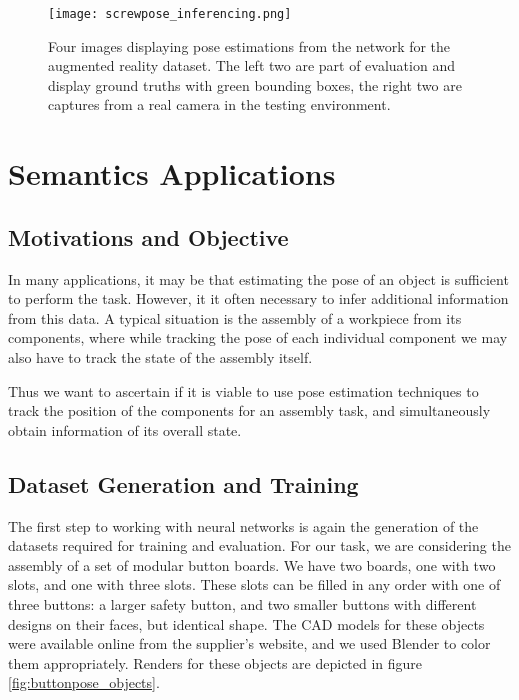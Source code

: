 \begin{figure}[ht]
    \texttt{[image: screwpose\_inferencing.png]}
    \caption{Four images displaying pose estimations from the network for the augmented reality dataset. The left two are part of evaluation and display ground truths with green bounding boxes, the right two are captures from a real camera in the testing environment.}
    \label{fig:screwpose_inferencing}
\end{figure}

\section{Semantics Applications}

\subsection{Motivations and Objective}

In many applications, it may be that estimating the pose of an object is sufficient to perform the task. However, it it often necessary to infer additional information from this data. A typical situation is the assembly of a workpiece from its components, where while tracking the pose of each individual component we may also have to track the state of the assembly itself.

Thus we want to ascertain if it is viable to use pose estimation techniques to track the position of the components for an assembly task, and simultaneously obtain information of its overall state.

\subsection{Dataset Generation and Training}

The first step to working with neural networks is again the generation of the datasets required for training and evaluation. For our task, we are considering the assembly of a set of modular button boards. We have two boards, one with two slots, and one with three slots. These slots can be filled in any order with one of three buttons: a larger safety button, and two smaller buttons with different designs on their faces, but identical shape. The CAD models for these objects were available online from the supplier's website, and we used Blender to color them appropriately. Renders for these objects are depicted in figure \ref{fig:buttonpose_objects}.

